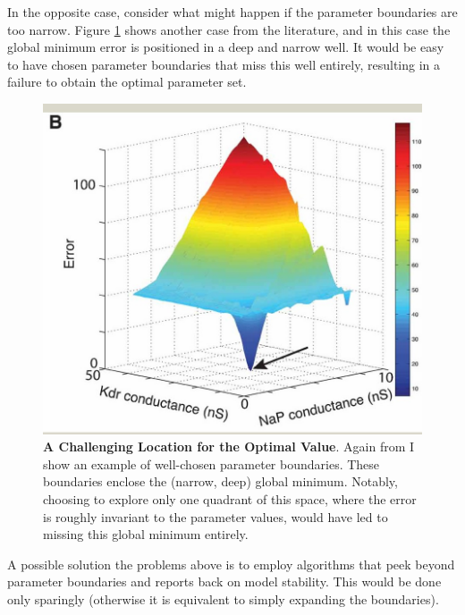 In the opposite case, consider what might happen if the parameter boundaries are too narrow.
Figure \ref{fig:best_at_edge} shows another case from the literature, and in this case the global minimum error is positioned in a deep and narrow well.
It would be easy to have chosen parameter boundaries that miss this well entirely, resulting in a failure to obtain the optimal parameter set. 

\begin{figure}
    \centering
    \includegraphics[scale=0.65]{figures/fninf-01-001-g009.jpg}
    \caption[A Challenging Location for the Optimal Value]{\textbf{A Challenging Location for the Optimal Value}.
    Again from \cite{van2008automated} I show an example of well-chosen parameter boundaries.
    These boundaries enclose the (narrow, deep) global minimum.
    Notably, choosing to explore only one quadrant of this space, where the error is roughly invariant to the parameter values, would have led to missing this global minimum entirely.}
    \label{fig:best_at_edge}
\end{figure}

A possible solution the problems above is to employ algorithms that peek beyond parameter boundaries and reports back on model stability.
This would be done only sparingly (otherwise it is equivalent to simply expanding the boundaries).

